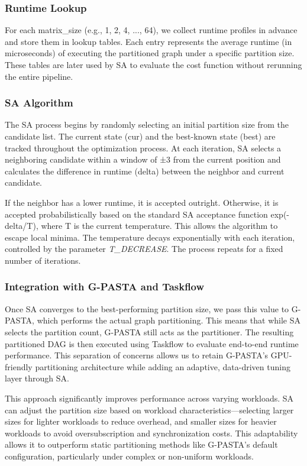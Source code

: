 \documentclass[9pt,conference]{IEEEtran}
\begin{document}
\subsubsection{Runtime Lookup}
For each matrix\_size (e.g., 1, 2, 4, ..., 64), we collect runtime profiles in advance and store them in lookup tables. Each entry represents the average runtime (in microseconds) of executing the partitioned graph under a specific partition size. These tables are later used by SA to evaluate the cost function without rerunning the entire pipeline.

\subsubsection{SA Algorithm}
The SA process begins by randomly selecting an initial partition size from the candidate list. The current state (cur) and the best-known state (best) are tracked throughout the optimization process. At each iteration, SA selects a neighboring candidate within a window of ±3 from the current position and calculates the difference in runtime (delta) between the neighbor and current candidate.

If the neighbor has a lower runtime, it is accepted outright. Otherwise, it is accepted probabilistically based on the standard SA acceptance function exp(-delta/T), where T is the current temperature. This allows the algorithm to escape local minima. The temperature decays exponentially with each iteration, controlled by the parameter \textit{T\_DECREASE}. The process repeats for a fixed number of iterations.

\subsubsection{Integration with G-PASTA and Taskflow}
Once SA converges to the best-performing partition size, we pass this value to G-PASTA, which performs the actual graph partitioning. This means that while SA selects the partition count, G-PASTA still acts as the partitioner. The resulting partitioned DAG is then executed using Taskflow to evaluate end-to-end runtime performance. This separation of concerns allows us to retain G-PASTA’s GPU-friendly partitioning architecture while adding an adaptive, data-driven tuning layer through SA.

This approach significantly improves performance across varying workloads. SA can adjust the partition size based on workload characteristics—selecting larger sizes for lighter workloads to reduce overhead, and smaller sizes for heavier workloads to avoid oversubscription and synchronization costs. This adaptability allows it to outperform static partitioning methods like G-PASTA’s default configuration, particularly under complex or non-uniform workloads.
\end{document}
